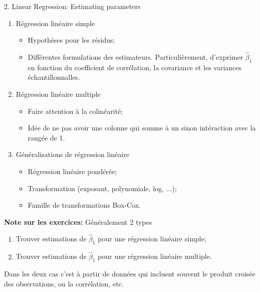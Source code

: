 \documentclass[12pt, titlepage, french]{report}
\begin{document}
\begin{CHPT_SUMM}{2. Linear Regression:  Estimating parameters}
\begin{enumerate}
	\item	Régression linéaire simple
	\begin{itemize}
		\item	Hypothèses pour les résidus;
		\item	Différentes formulations des estimateurs. Particulièrement, d'exprimer $\hat\beta_{1}$ en fonction du coefficient de corrélation, la covariance et les variances échantillonnalles.
	\end{itemize}
	\item	Régression linéaire multiple
	\begin{itemize}
		\item	Faire attention à la colinéarité;
		\item	Idée de ne pas avoir une colonne qui somme à un sinon intéraction avec la rangée de 1.
	\end{itemize}
	\item	Généralisations de régression linéaire
	\begin{itemize}
		\item	Régression linéaire pondérée;
		\item	Transformation (exposant, polynomiale, log, ...);
		\item	Famille de transformations Box-Cox.
	\end{itemize}
\end{enumerate}
\textbf{Note sur les exercices:} Généralement 2 types
\begin{enumerate}
	\item	Trouver estimations de $\hat\beta_{1}$ pour une régression linéaire simple;
	\item	Trouver estimations de $\hat\beta_{1}$ pour une régression linéaire multiple.
\end{enumerate}
Dans les deux cas c'est à partir de données qui incluent souvent le produit croisée des observations, ou la corrélation, etc.
\end{CHPT_SUMM}
\end{document}
